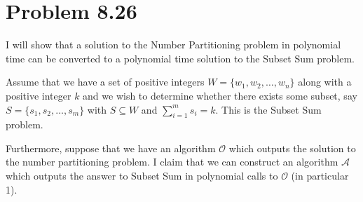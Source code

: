 \documentclass{article}
\begin{document}
\section{Problem 8.26}
I will show that a solution to the Number Partitioning problem in polynomial time can be converted to a polynomial time solution to the Subset Sum problem.

Assume that we have a set of positive integers $W= \{ w_1, w_2, \dots, w_n\}$ along with a positive integer $k$ and we wish to determine whether there exists some subset, say $S=\{s_1,s_2,\dots,s_m\}$ with $S \subseteq W$ and $\sum_{i=1}^m s_i = k$. This is the Subset Sum problem.

Furthermore, suppose that we have an algorithm $\mathcal{O}$ which outputs the solution to the number partitioning problem. I claim that we can construct an algorithm $\mathcal{A}$ which outputs the answer to Subset Sum in polynomial calls to $\mathcal{O}$ (in particular 1).
\end{document}
